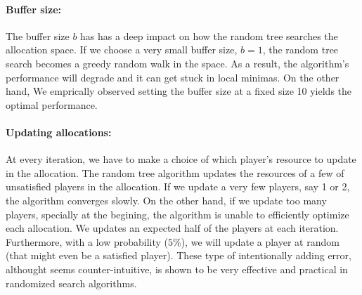 \paragraph{Buffer size:} The buffer size $b$ has has a deep impact on how the random tree searches the allocation space. If we choose a very small buffer size, $b=1$, the random tree search becomes a greedy random walk in the space. As a result, the algorithm's performance will degrade and it can get stuck in local minimas. On the other hand,
We emprically observed setting the buffer size at a fixed size 10 yields the optimal performance.

\paragraph{Updating allocations:} At every iteration, we have to make a choice of which player's resource to update in the allocation.
The random tree algorithm updates the resources of a few of unsatisfied players in the allocation.
If we update a very few players, say 1 or 2, the algorithm converges slowly. On the other hand, if we update too many players, specially at the begining, the algorithm is unable to efficiently optimize each allocation. We updates an expected half of the players at each iteration. Furthermore, with a low probability ($5\%$), we will update a player at random (that might even be a satisfied player). These type of intentionally adding error, althought seems counter-intuitive, is shown to be very effective and practical in randomized search algorithms.


